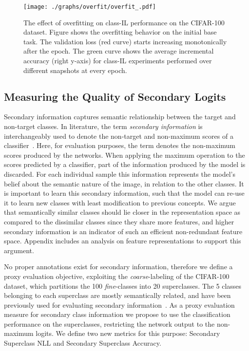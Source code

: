 \documentclass[final]{cvpr}
\begin{document}
\begin{figure}[!t]
\texttt{[image: ./graphs/overfit/overfit\_.pdf]}
\caption{The effect of overfitting on class-IL performance on the CIFAR-100 dataset. Figure shows the overfitting behavior on the initial base task. The validation loss (red curve) starts increasing monotonically after the  epoch. The green curve shows the average incremental accuracy (right y-axis) for class-IL experiments performed over different snapshots at every  epoch. }
\label{fig:overfit}
\end{figure}


\subsection{Measuring the Quality of Secondary Logits}
Secondary information captures semantic relationship between the target and non-target classes.
In literature, the term \textit{secondary information} is interchangeably used to denote the non-target and non-maximum scores of a classifier~\cite{kdingen_2019_AAAI}. 
Here, for evaluation purposes, the term denotes the non-maximum scores produced by the networks.
When applying the maximum operation to the scores predicted by a classifier, part of the information produced by the model is discarded.
For each individual sample this information represents the model's belief about the semantic nature of the image, in relation to the other classes.
It is important to learn this secondary information, such that the model can re-use it to learn new classes with least modification to previous concepts.
We argue that semantically similar classes should lie closer in the representation space as compared to the dissimilar classes since they share more features, and higher secondary information is an indicator of such an efficient non-redundant feature space. Appendix includes an analysis on feature representations to support this argument.

No proper annotations exist for secondary information, therefore we define a proxy evaluation objective, exploiting the  \textit{coarse}-labeling of the CIFAR-100 dataset, which partitions the 100 \textit{fine}-classes into 20 superclasses. The 5 classes belonging to each superclass are mostly semantically related, and have been previously used for evaluating secondary information~\cite{kdingen_2019_AAAI}.
As a proxy evaluation measure for secondary class information we propose to use the classification performance on the superclasses, restricting the network output to the non-maximum logits. We define two new metrics for this purpose: Secondary Superclass NLL and Secondary Superclass Accuracy.
\end{document}

